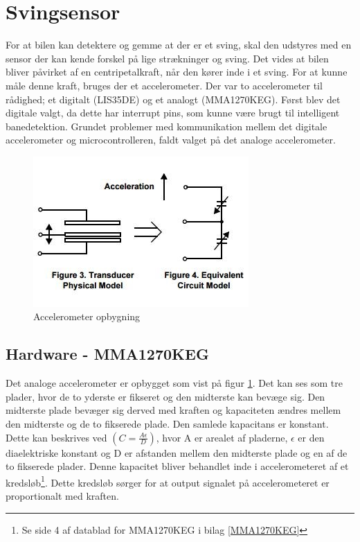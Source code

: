 \section{Svingsensor}
\label{svingsensor}
For at bilen kan detektere og gemme at der er et sving, skal den udstyres med en sensor der kan kende forskel på lige strækninger og sving. Det vides at bilen bliver påvirket af en centripetalkraft, når den kører inde i et sving. For at kunne måle denne kraft, bruges der et accelerometer. Der var to accelerometer til rådighed; et digitalt (LIS35DE) og et analogt (MMA1270KEG). Først blev det digitale valgt, da dette har interrupt pins, som kunne være brugt til intelligent banedetektion. Grundet problemer med kommunikation mellem det digitale accelerometer og microcontrolleren, faldt valget på det analoge accelerometer.

\begin{figure}[h!]
\center
\includegraphics[scale=1]{./Graphics/Acceleration}
\caption{Accelerometer opbygning}
\label{Acceleration}
\end{figure}

\subsection{Hardware - MMA1270KEG}
Det analoge accelerometer er opbygget som vist på figur \ref{Acceleration}. Det kan ses som tre plader, hvor de to yderste er fikseret og den midterste kan bevæge sig. Den midterste plade bevæger sig derved med kraften og kapaciteten ændres mellem den midterste og de to fikserede plade. Den samlede kapacitans er konstant. Dette kan beskrives ved $(C=\frac{A\epsilon}{D})$, hvor A er arealet af pladerne, $\epsilon$ er den diaelektriske konstant og D er afstanden mellem den midterste plade og en af de to fikserede plader. Denne kapacitet bliver behandlet inde i accelerometeret af et kredsløb\footnote{Se side 4 af datablad for MMA1270KEG i bilag \ref{MMA1270KEG}}. Dette kredsløb sørger for at output signalet på accelerometeret er proportionalt med kraften.

